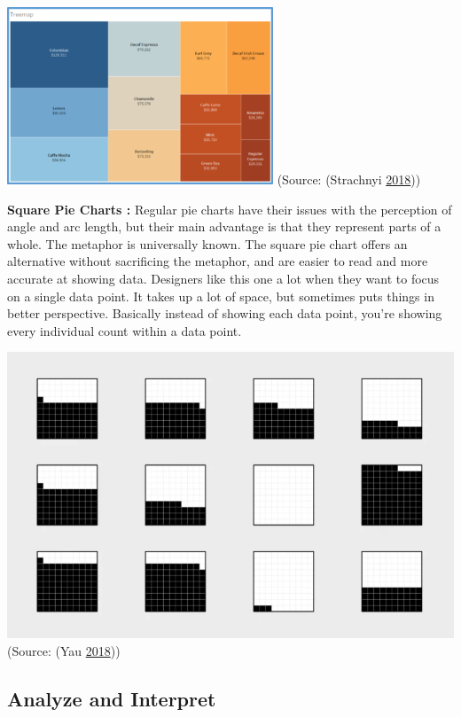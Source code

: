 \documentclass[]{book}
\begin{document}
\includegraphics{images/3.2.2_Treemap.png}
(Source: (Strachnyi \protect\hyperlink{ref-Charts_CheatSheet}{2018}))

\textbf{Square Pie Charts :} Regular pie charts have their issues with the perception of angle and arc length, but their main advantage is that they represent parts of a whole. The metaphor is universally known. The square pie chart offers an alternative without sacrificing the metaphor, and are easier to read and more accurate at showing data. Designers like this one a lot when they want to focus on a single data point. It takes up a lot of space, but sometimes puts things in better perspective. Basically instead of showing each data point, you're showing every individual count within a data point.

\includegraphics{images/3.2.2_Square_pie_chart.png}
(Source: (Yau \protect\hyperlink{ref-Square_Pie_Charts}{2018}))

\hypertarget{analyze-and-interpret}{%
\subsection{Analyze and Interpret}\label{analyze-and-interpret}}
\end{document}
